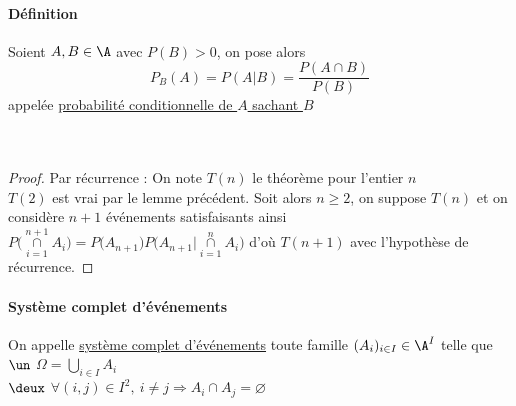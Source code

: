 		\paragraph{Définition}
			Soient $A,B\in\A$ avec $P(B) >0$, on pose alors \[P_B(A) = P(A\vert B) = \frac{P(A\cap B)}{P(B)} \]
			appelée \uline{probabilité conditionnelle de $A$ sachant $B$} \trait
		\vspace*{0.5cm} \\ 
		\vspace*{0.5cm} \\
		\vspace*{0.5cm} \\
		\begin{proof}
		Par récurrence : On note $T(n)$ le théorème pour l'entier $n$\\
		$T(2)$ est vrai par le lemme précédent. Soit alors $n\geqslant 2$, on suppose $T(n)$ et on considère $n+1$ événements satisfaisants ainsi $P\big( \overset{n+1}{\underset{i=1}{\cap}} A_i \big) = P\big( A_{n+1}\big) P\big( A_{n+1} \vert \overset{n}{\underset{i=1}{\cap}} A_i \big)$ d'où $T(n+1)$ avec l'hypothèse de récurrence.
		\end{proof}
		\traitd
		\paragraph{Système complet d'événements}
			On appelle \uline{système complet d'événements} toute famille $(A_i)_{i\in I}\in\A^I$ telle que \\
			\hspace*{2.5cm} $\un$ $\Omega = \bigcup\limits_{i\in I} A_i$\\
			\hspace*{2.5cm} $\deux$ $\forall (i,j)\in I^2 ,~ i\neq j \Rightarrow A_i\cap A_j = \varnothing$ \trait \newpage \traitd
